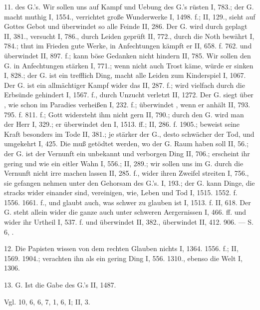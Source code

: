 11.  des G.’s. Wir sollen uns auf Kampf und Uebung des G.’s rüsten I, 783.; der G. macht muthig I, 1554., verrichtet große Wunderwerke I, 1498. f.; II, 129., sieht auf Gottes Gebot und überwindet so alle Feinde II, 286. Der G. wird durch  geplagt II, 381., versucht I, 786., durch Leiden geprüft II, 772., durch die Noth bewährt I, 784.; thut im Frieden gute Werke, in Anfechtungen kämpft er II, 658. f. 762. und überwindet II, 897. f.; kann böse Gedanken nicht hindern II, 785. Wir sollen den G. in Anfechtungen stärken I, 771.; wenn nicht auch Trost käme, würde er sinken I, 828.; der G. ist ein trefflich Ding, macht alle Leiden zum Kinderspiel I, 1067. Der G. ist ein allmächtiger Kampf wider das  II, 287. f.; wird vielfach durch die Erbsünde gehindert I, 1567. f., durch Unzucht verletzt II, 1272. Der G. siegt über , wie schon im Paradies verheißen I, 232. f.; überwindet , wenn er anhält II, 793. 795. f. 811. f.; Gott widersteht ihm nicht gern II, 790.; durch den G. wird man der  Herr I, 329.; er überwindet den  I, 1513. ff.; II, 286. f. 1905.; beweist seine Kraft besonders im Tode II, 381.; je stärker der G., desto schwächer der Tod, und umgekehrt I, 425. Die  muß getödtet werden, wo der G. Raum haben soll II, 56.; der G. ist der Vernunft ein unbekannt und verborgen Ding II, 706.; erscheint ihr gering und wie ein eitler Wahn I, 556.; II, 289.; wir sollen uns im G. durch die Vernunft nicht irre machen lassen II, 285. f., wider ihren Zweifel streiten I, 756., sie gefangen nehmen unter den Gehorsam des G.’s. I, 193.; der G. kann Dinge, die stracks wider einander sind, vereinigen, wie, Leben und Tod I, 1515. 1552. f. 1556. 1661. f., und glaubt auch, was schwer zu glauben ist I, 1513. f. II, 618. Der G. steht allein wider die ganze  auch unter schweren Aergernissen I, 466. ff. und wider ihr Urtheil I, 537. f. und überwindet II, 382., überwindet  II, 412. 906. — S.  6, .

12.  Die Papisten wissen von dem rechten Glauben nichts I, 1364. 1556. f.; II, 1569. 1904.; verachten ihn als ein gering Ding I, 556. 1310., ebenso die Welt I, 1306.

13.  G.  Ist die Gabe des G.’s II, 1487.

Vgl.  10,  6,  6,  7,  1,  6,  I; II, 3.

